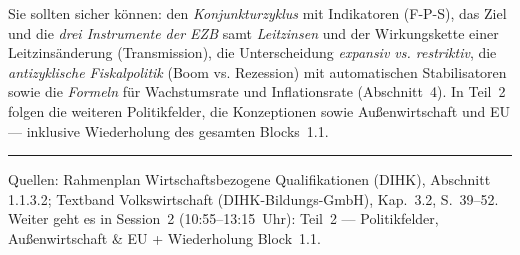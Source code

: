 \documentclass[11pt, a4paper]{article}
\begin{document}
\begin{merksatz}[title={\bfseries Wichtig für die Prüfungsvorbereitung (Teil 1)}]
Sie sollten sicher können: den \emph{Konjunkturzyklus} mit Indikatoren (F-P-S), das Ziel
und die \emph{drei Instrumente der EZB} samt \emph{Leitzinsen} und der Wirkungskette einer
Leitzinsänderung (Transmission), die Unterscheidung \emph{expansiv vs. restriktiv}, die
\emph{antizyklische Fiskalpolitik} (Boom vs. Rezession) mit automatischen Stabilisatoren
sowie die \emph{Formeln} für Wachstumsrate und Inflationsrate (Abschnitt~4). In Teil~2
folgen die weiteren Politikfelder, die Konzeptionen sowie Außenwirtschaft und EU ---
inklusive Wiederholung des gesamten Blocks~1.1.
\end{merksatz}

\vspace{1em}
\hrule
\vspace{0.8em}
\noindent\textsf{\small Quellen: Rahmenplan Wirtschaftsbezogene Qualifikationen (DIHK), Abschnitt 1.1.3.2;
Textband Volkswirtschaft (DIHK-Bildungs-GmbH), Kap.~3.2, S.~39--52. Weiter geht es in Session~2 (10:55--13:15~Uhr):
Teil~2 --- Politikfelder, Außenwirtschaft \& EU + Wiederholung Block~1.1.}
\end{document}
